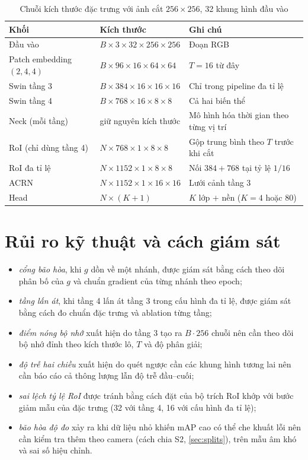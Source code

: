 \begin{table}[H]
\centering
\caption{Chuỗi kích thước đặc trưng với ảnh cắt $256 \times 256$, 32 khung hình đầu vào}
\label{tab:shapes}
\small
\begin{tabularx}{\textwidth}{llX}
\toprule
\textbf{Khối} & \textbf{Kích thước} & \textbf{Ghi chú}\\
\midrule
Đầu vào & $B \times 3 \times 32 \times 256 \times 256$ & Đoạn RGB\\
Patch embedding $(2, 4, 4)$ & $B \times 96 \times 16 \times 64 \times 64$ & $T = 16$ từ đây\\
Swin tầng 3 & $B \times 384 \times 16 \times 16 \times 16$ & Chỉ trong pipeline đa tỉ lệ\\
Swin tầng 4 & $B \times 768 \times 16 \times 8 \times 8$ & Cả hai biến thể\\
Neck (mỗi tầng) & giữ nguyên kích thước & Mô hình hóa thời gian theo từng vị trí\\
RoI (chỉ dùng tầng 4) & $N \times 768 \times 1 \times 8 \times 8$ & Gộp trung bình theo $T$ trước khi cắt\\
RoI đa tỉ lệ & $N \times 1152 \times 1 \times 8 \times 8$ & Nối $384 + 768$ tại tỷ lệ $1/16$\\
ACRN & $N \times 1152 \times 1 \times 16 \times 16$ & Lưới cảnh tầng 3\\
Head & $N \times (K + 1)$ & $K$ lớp $+$ nền ($K = 4$ hoặc 80)\\
\bottomrule
\end{tabularx}
\end{table}

\section{Rủi ro kỹ thuật và cách giám sát}
\label{sec:risks}

\begin{itemize}
  \item \emph{cổng bão hòa}, khi $g$ dồn về một nhánh, được giám sát bằng cách theo dõi phân bố của $g$ và chuẩn gradient của từng nhánh theo epoch;
  \item \emph{tầng lấn át}, khi tầng 4 lấn át tầng 3 trong cấu hình đa tỉ lệ, được giám sát bằng cách đo chuẩn đặc trưng và ablation từng tầng;
  \item \emph{điểm nóng bộ nhớ} xuất hiện do tầng 3 tạo ra $B \cdot 256$ chuỗi nên cần theo dõi bộ nhớ đỉnh theo kích thước lô, $T$ và độ phân giải;
  \item \emph{độ trễ hai chiều} xuất hiện do quét ngược cần các khung hình tương lai nên cần báo cáo cả thông lượng lẫn độ trễ đầu--cuối;
  \item \emph{sai lệch tỷ lệ RoI} được tránh bằng cách đặt  của bộ trích RoI khớp với bước giảm mẫu của đặc trưng (32 với tầng 4, 16 với cấu hình đa tỉ lệ);
  \item \emph{bão hòa độ đo} xảy ra khi dữ liệu nhỏ khiến mAP cao có thể che khuất lỗi nên cần kiểm tra thêm theo camera (cách chia S2, \cref{sec:splits}), trên mẫu âm khó và sai số hiệu chỉnh.
\end{itemize}

